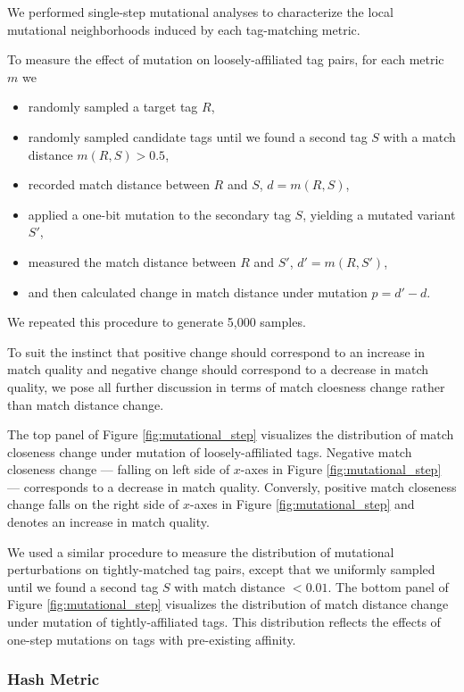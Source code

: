 

We performed single-step mutational analyses to characterize the local mutational neighborhoods induced by each tag-matching metric.

To measure the effect of mutation on loosely-affiliated tag pairs, for each metric $m$ we
\begin{itemize}
    \item randomly sampled a target tag $R$,
    \item randomly sampled candidate tags until we found a second tag $S$ with a match distance $m(R, S) > 0.5$,
    \item recorded match distance between $R$ and $S$, $d = m(R, S)$,
    \item applied a one-bit mutation to the secondary tag $S$, yielding a mutated variant $S'$,
    \item measured the match distance between $R$ and $S'$, $d' = m(R, S')$,
    \item and then calculated change in match distance under mutation $p = d' - d$.
\end{itemize}
We repeated this procedure to generate 5,000 samples.

To suit the instinct that positive change should correspond to an increase in match quality and negative change should correspond to a decrease in match quality, we pose all further discussion in terms of match cloesness change rather than match distance change.

The top panel of Figure \ref{fig:mutational_step} visualizes the distribution of match closeness change under mutation of loosely-affiliated tags.
Negative match closeness change --- falling on left side of $x$-axes in Figure \ref{fig:mutational_step} --- corresponds to a decrease in match quality.
Conversly, positive match closeness change falls on the right side of $x$-axes in Figure \ref{fig:mutational_step} and denotes an increase in match quality.

We used a similar procedure to measure the distribution of mutational perturbations on tightly-matched tag pairs, except that we uniformly sampled until we found a second tag $S$ with match distance $< 0.01$.
The bottom panel of Figure \ref{fig:mutational_step} visualizes the distribution of match distance change under mutation of tightly-affiliated tags.
This distribution reflects the effects of one-step mutations on tags with pre-existing affinity.

\subsubsection{Hash Metric}

